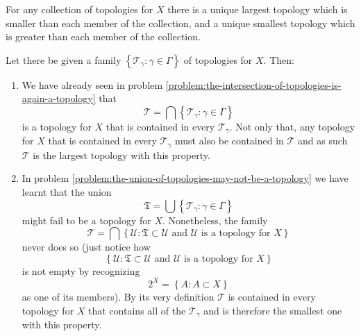 \begin{problem}
  For any collection of topologies for \(X\) there is a unique largest topology
  which is smaller than each member of the collection, and a unique smallest
  topology which is greater than each member of the collection.
  \label{problem:smallest-and-largest-topologies}
\end{problem}

\begin{solution}
  Let there be given a family
  \(\left\{\mathcal{T}_{\gamma}:\gamma\in\Gamma\right\}\) of topologies for
  \(X\). Then:
  \begin{enumerate}
    \item
      We have already seen in problem
      \ref{problem:the-intersection-of-topologies-is-again-a-topology} that
      \[
        \mathcal{T}=\bigcap\left\{\mathcal{T}_{\gamma}:\gamma\in\Gamma\right\}
      \]
      is a topology for \(X\) that is contained in every
      \(\mathcal{T}_{\gamma}\). Not only that, any topology for \(X\) that is
      contained in every \(\mathcal{T}_{\gamma}\) must also be contained in
      \(\mathcal{T}\) and as such \(\mathcal{T}\) is the largest topology with
      this property.
    \item
      In problem
      \ref{problem:the-union-of-topologies-may-not-be-a-topology}
      we have learnt that the union
      \begin{equation}
        \mathfrak{T}=\bigcup\left\{\mathcal{T}_{\gamma}:\gamma\in\Gamma\right\}
        \label{eq:the-union-of-the-members-of-t-gamma}
      \end{equation}
      might fail to be a topology for \(X\). Nonetheless, the family
      \begin{equation}
        \mathcal{T}=\bigcap\left\{\mathcal{U}:\mathfrak{T}\subset\mathcal{U}\text{ and }\mathcal{U}\text{ is a topology for }X\right\}
      \end{equation}
      never does so (just notice how
      \[
        \left\{\mathcal{U}:\mathfrak{T}\subset\mathcal{U}\text{ and }\mathcal{U}\text{ is a topology for }X\right\}
      \]
      is not empty by recognizing 
      \[
        2^{X}=\left\{A:A\subset{X}\right\}
      \]
      as one of its members). By its very definition \(\mathcal{T}\) is
      contained in every topology for \(X\) that contains all of the
      \(\mathcal{T}_{\gamma}\) and is therefore the smallest one with this
      property.
  \end{enumerate}
\end{solution}
